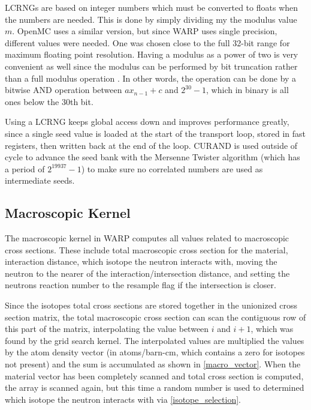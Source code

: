 LCRNGs are based on integer numbers which must be converted to floats when the numbers are needed.  This is done by simply dividing my the modulus value $m$.  OpenMC uses a similar version, but since WARP uses single precision, different values were needed.   One was chosen close to the full 32-bit range for maximum floating point resolution.  Having a modulus as a power of two is very convenient as well since the modulus can be performed by bit truncation rather than a full modulus operation \cite{openmc}.  In other words, the operation can be done by a bitwise AND operation between $a x_{n-1} + c$ and $2^{30}-1$, which in binary is all ones below the 30th bit.

Using a LCRNG keeps global access down and improves performance greatly, since a single seed value is loaded at the start of the transport loop, stored in fast registers, then written back at the end of the loop.  CURAND is used outside of cycle to advance the seed bank with the Mersenne Twister algorithm (which has a period of $2^{19937} - 1$) to make sure no correlated numbers are used as intermediate seeds.

\subsection{Macroscopic Kernel}

The macroscopic kernel in WARP computes all values related to macroscopic cross sections.  These include total macroscopic cross section for the material, interaction distance, which isotope the neutron interacts with, moving the neutron to the nearer of the interaction/intersection distance, and setting the neutrons reaction number to the resample flag if the intersection is closer.  

Since the isotopes total cross sections are stored together in the unionized cross section matrix, the total macroscopic cross section can scan the contiguous row of this part of the matrix, interpolating the value between $i$ and $i+1$, which was found by the grid search kernel.  The interpolated values are multiplied the values by the atom density vector (in atoms/barn-cm, which contains a zero for isotopes not present) and the sum is accumulated as shown in \eqref{macro_vector}.  When the material vector has been completely scanned and total cross section is computed, the array is scanned again, but this time a random number is used to determined which isotope the neutron interacts with via \eqref{isotope_selection}.

